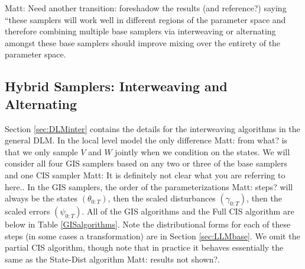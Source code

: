\documentclass{article}
\newcommand{\matt}[1]{{\color{red} Matt: #1}}
\begin{document}
\matt{Need another transition: foreshadow the results (and reference?) saying ``these samplers will work well in different regions of the parameter space and therefore combining multiple base samplers via interweaving or alternating amongst these base samplers should improve mixing over the entirety of the parameter space.}



\subsection{Hybrid Samplers: Interweaving and Alternating}
Section \ref{sec:DLMinter} contains the details for the interweaving algorithms in the general DLM. In the local level model the only difference \matt{from what?} is that we only sample $V$ and $W$ jointly when we condition on the states. We will consider all four GIS samplers based on any two or three of the base samplers and one CIS sampler \matt{It is definitely not clear what you are referring to here.}. In the GIS samplers, the order of the parameterizations \matt{steps?} will always be the states $(\theta_{0:T})$, then the scaled disturbances $(\gamma_{0:T})$, then the scaled errors $(\psi_{0:T})$. All of the GIS algorithms and the Full CIS algorithm are below in Table \ref{GISalgorithms}. Note the distributional forms for each of these steps (in some cases a transformation) are in Section \ref{sec:LLMbase}. We omit the partial CIS algorithm, though note that in practice it behaves essentially the same as the State-Dist algorithm \matt{results not shown?}.
\end{document}
